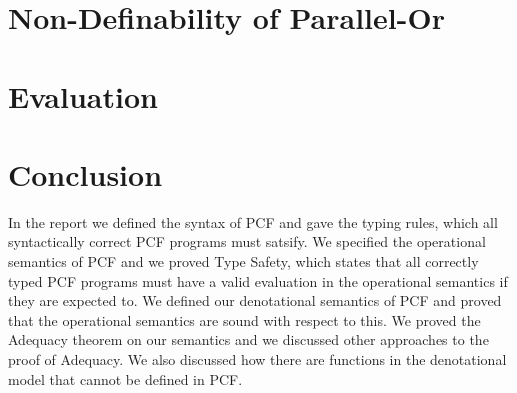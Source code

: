 \documentclass{bhamthesis}
\begin{document}





\chapter{Non-Definability of Parallel-Or}\label{por}



\chapter{Evaluation}\label{ch9}



\chapter{Conclusion}\label{ch10}
In the report we defined the syntax of PCF and gave the typing rules, which all syntactically correct PCF programs must satsify. We specified the operational semantics of PCF and we proved Type Safety, which states that all correctly typed PCF programs must have a valid evaluation in the operational semantics if they are expected to.
We defined our denotational semantics of PCF and proved that the operational semantics are sound with respect to this. We proved the Adequacy theorem on our semantics and we discussed other approaches to the proof of Adequacy. We also discussed how there are functions in the denotational model that cannot be defined in PCF.




\end{document}

